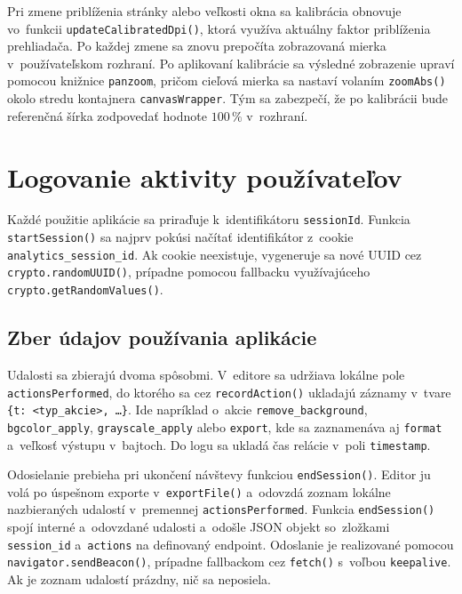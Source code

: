Pri zmene priblíženia stránky alebo veľkosti okna sa kalibrácia obnovuje vo~funkcii \texttt{updateCalibratedDpi()}, ktorá využíva aktuálny faktor priblíženia prehliadača. Po každej zmene sa znovu prepočíta zobrazovaná mierka v~používateľskom rozhraní. Po aplikovaní kalibrácie sa výsledné zobrazenie upraví pomocou knižnice \texttt{panzoom}, pričom cieľová mierka sa nastaví volaním \texttt{zoomAbs()} okolo stredu kontajnera \texttt{canvasWrapper}. Tým sa zabezpečí, že po kalibrácii bude referenčná šírka zodpovedať hodnote \(100\,\%\) v~rozhraní.

\section{Logovanie aktivity používateľov}

Každé použitie aplikácie sa priraďuje k~identifikátoru \texttt{sessionId}. Funkcia \texttt{startSession()} sa najprv pokúsi načítať identifikátor z~cookie \texttt{analytics\_session\_id}. Ak cookie neexistuje, vygeneruje sa nové UUID cez \texttt{crypto.randomUUID()}, prípadne pomocou fallbacku využívajúceho \texttt{crypto.getRandomValues()}.

\subsection{Zber údajov používania aplikácie}

Udalosti sa zbierajú dvoma spôsobmi. V~editore sa udržiava lokálne pole \texttt{actionsPerformed}, do ktorého sa cez \texttt{recordAction()} ukladajú záznamy v~tvare \texttt{\{t: <typ\_akcie>, \dots\}}. Ide napríklad o~akcie \texttt{remove\_background}, \texttt{bgcolor\_apply}, \texttt{grayscale\_apply} alebo \texttt{export}, kde sa zaznamenáva aj \texttt{format} a~veľkosť výstupu v~bajtoch. Do logu sa ukladá čas relácie v~poli \texttt{timestamp}.

Odosielanie prebieha pri ukončení návštevy funkciou \texttt{endSession()}. Editor ju volá po úspešnom exporte v~\texttt{exportFile()} a~odovzdá zoznam lokálne nazbieraných udalostí v~premennej \texttt{actionsPerformed}. Funkcia \texttt{endSession()} spojí interné a~odovzdané udalosti a~odošle JSON objekt so~zložkami \texttt{session\_id} a~\texttt{actions} na definovaný endpoint. Odoslanie je realizované pomocou \texttt{navigator.sendBeacon()}, prípadne fallbackom cez \texttt{fetch()} s~voľbou \texttt{keepalive}. Ak je zoznam udalostí prázdny, nič sa neposiela.

